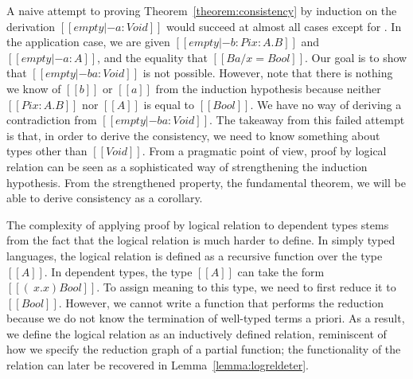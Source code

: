 \documentclass[acmsmall,screen=true,
\ifpublic review=false\else,review=true\fi
  ,anonymous=\ifanonymous true\else false\fi]{acmart}
\begin{document}
A naive attempt to proving Theorem~\ref{theorem:consistency} by
induction on the derivation $[[empty |- a : Void]]$ would succeed at
almost all cases except for . In the application
case, we are given $[[empty |- b : Pi x : A . B]]$ and $[[empty |- a : A]]$, and
the equality that $[[B {a / x} = Bool]]$. Our goal is to show that
$[[empty |- b a : Void]]$ is not possible. However, note that there is
nothing we know of $[[b]]$ or $[[a]]$ from the induction hypothesis
because neither $[[Pi x : A . B]]$ nor $[[A]]$ is equal to $[[Bool]]$.
We have no way of deriving a contradiction from $[[empty |- b a :
Void]]$. The takeaway from this failed attempt is that, in order to
derive the consistency, we need to know something about types other
than $[[Void]]$. From a pragmatic point of view, proof by logical
relation can be seen as a sophisticated way of strengthening the
induction hypothesis. From the strengthened property, the fundamental
theorem, we will be able to derive consistency as a corollary.

The complexity of applying proof by logical relation to dependent types stems
from the fact that the logical relation is much harder to define. In
simply typed languages, the logical relation is defined as a recursive
function over the type $[[A]]$.
In dependent types, the type
$[[A]]$ can take the form $[[(\ x . x ) Bool]]$. To assign meaning to
this type, we need to first reduce it to $[[Bool]]$. However, we
cannot write a function that performs the reduction because we do not
know the termination of well-typed terms a priori. As a result, we
define the logical relation as an inductively defined relation,
reminiscent of how we specify the reduction graph of a partial
function; the functionality of the relation can later be recovered in Lemma~\ref{lemma:logreldeter}.
\end{document}
